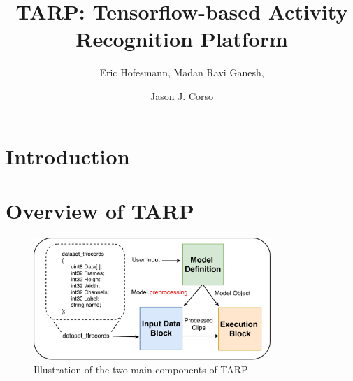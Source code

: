 \documentclass{llncs}
\begin{document}
\pagestyle{headings}
\mainmatter
\def\ECCV18SubNumber{1816}  %

\title{TARP: Tensorflow-based Activity Recognition Platform} %



\author{Eric Hofesmann, Madan Ravi Ganesh, \and Jason J. Corso}
\newcommand{\acro}{TARP}
\newcommand{\model}{\textit{Model submodule}}
\newcommand{\checkpoint}{\textit{Checkpoint submodule}}
\newcommand{\metrics}{\textit{Metrics submodule}}
\newcommand{\data}{\textbf{Data Input Block}}
\newcommand{\exec}{\textbf{Execution Block}}

\maketitle

\begin{abstract}
\keywords{}
\end{abstract}

\section{Introduction}
\label{sec:intro}

\section{Overview of \acro}
\label{sec:overview}

\begin{figure}[b!]
\centering
\includegraphics[width=0.8\textwidth]{images/overview.pdf}
\caption{Illustration of the two main components of \acro}
\label{fig:overview}
\end{figure}
\end{document}
